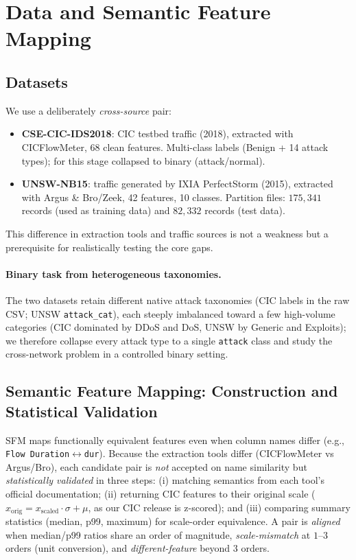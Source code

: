 \documentclass[preprint,12pt,authoryear]{elsarticle}
\begin{document}
\section{Data and Semantic Feature Mapping}
\label{sec:sfm}

\subsection{Datasets}
We use a deliberately \emph{cross-source} pair:
\begin{itemize}
  \item \textbf{CSE-CIC-IDS2018}: CIC testbed traffic (2018), extracted with
  CICFlowMeter, 68 clean features. Multi-class labels (Benign + 14 attack types);
  for this stage collapsed to binary (attack/normal).
  \item \textbf{UNSW-NB15}: traffic generated by IXIA PerfectStorm (2015),
  extracted with Argus \& Bro/Zeek, 42 features, 10 classes. Partition files:
  $175{,}341$ records (used as training data) and $82{,}332$ records (test data).
\end{itemize}
This difference in extraction tools and traffic sources is not a weakness but a
prerequisite for realistically testing the core gaps.

\paragraph{Binary task from heterogeneous taxonomies.} The two datasets retain
different native attack taxonomies (CIC labels in the raw CSV; UNSW
\texttt{attack\_cat}), each steeply imbalanced toward a few high-volume categories
(CIC dominated by DDoS and DoS, UNSW by Generic and Exploits); we therefore collapse
every attack type to a single \texttt{attack} class and study the cross-network
problem in a controlled binary setting.

\subsection{Semantic Feature Mapping: Construction and Statistical Validation}
\label{sec:sfmmap}
SFM maps functionally equivalent features even when column names differ (e.g.,
\texttt{Flow Duration}$\leftrightarrow$\texttt{dur}). Because the extraction tools
differ (CICFlowMeter vs Argus/Bro), each candidate pair is \emph{not} accepted on
name similarity but \emph{statistically validated} in three steps: (i) matching
semantics from each tool's official documentation; (ii) returning CIC features to
their original scale ($x_{\text{orig}} = x_{\text{scaled}}\cdot\sigma + \mu$, as our
CIC release is z-scored); and (iii) comparing summary statistics (median, p99,
maximum) for scale-order equivalence. A pair is \emph{aligned} when median/p99 ratios
share an order of magnitude, \emph{scale-mismatch} at $1$--$3$ orders (unit
conversion), and \emph{different-feature} beyond $3$ orders.
\end{document}
